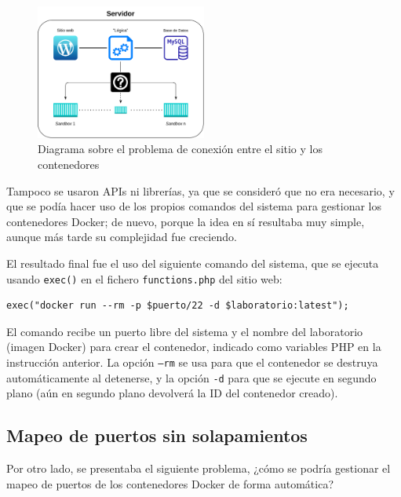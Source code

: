             \begin{figure}[htbp]
                \centering

                \includegraphics[width=0.5\textwidth]{images/Diagramas/conexion.png}
                \caption{Diagrama sobre el problema de conexión entre el sitio y los contenedores}
                \label{fig:conexion}
            \end{figure}

            Tampoco se usaron APIs ni librerías, ya que se consideró que no era necesario, y que se podía hacer uso de los propios comandos del sistema para gestionar los contenedores Docker; de nuevo, porque la idea en sí resultaba muy simple, aunque más tarde su complejidad fue creciendo.

            El resultado final fue el uso del siguiente comando del sistema, que se ejecuta usando \texttt{exec()} en el fichero \texttt{functions.php} del sitio web:
            \\
            
            \begin{lstlisting}[style=php_style]
    exec("docker run --rm -p $puerto/22 -d $laboratorio:latest");
            \end{lstlisting}

            El comando recibe un puerto libre del sistema y el nombre del laboratorio (imagen Docker) para crear el contenedor, indicado como variables PHP en la instrucción anterior. La opción \texttt{--rm} se usa para que el contenedor se destruya automáticamente al detenerse, y la opción \texttt{-d} para que se ejecute en segundo plano (aún en segundo plano devolverá la ID del contenedor creado).


        \subsection{Mapeo de puertos sin solapamientos}

            Por otro lado, se presentaba el siguiente problema, ¿cómo se podría gestionar el mapeo de puertos de los contenedores Docker de forma automática?


